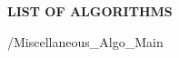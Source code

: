 
\centerline{\normalsize\textbf{LIST OF ALGORITHMS}}
\vspace{-3cm}
/Miscellaneous\List\_Algo\_Main

\newpage 